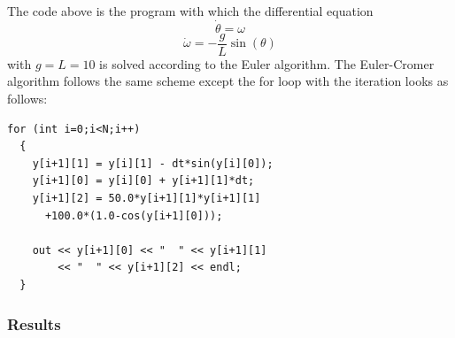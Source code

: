 \documentclass[12pt,a4paper]{article}	%
\begin{document}
The code above is the program with which the differential equation 
\begin{equation}
\dot{\theta}  = \omega  \nonumber
\end{equation}
\begin{equation}
\dot{\omega}  = -\frac{g}{L} \sin(\theta) 
\end{equation}
with $g = L = 10$ is solved according to the Euler algorithm. The Euler-Cromer algorithm follows the same scheme except the for loop with the iteration looks as follows:
\\
\begin{lstlisting}[frame=single]  
for (int i=0;i<N;i++)
  {
    y[i+1][1] = y[i][1] - dt*sin(y[i][0]);
    y[i+1][0] = y[i][0] + y[i+1][1]*dt;
    y[i+1][2] = 50.0*y[i+1][1]*y[i+1][1]
      +100.0*(1.0-cos(y[i+1][0]));

    out << y[i+1][0] << "  " << y[i+1][1]
        << "  " << y[i+1][2] << endl;
  }
\end{lstlisting}
\newpage

\subsubsection{Results}






%
\end{document}
